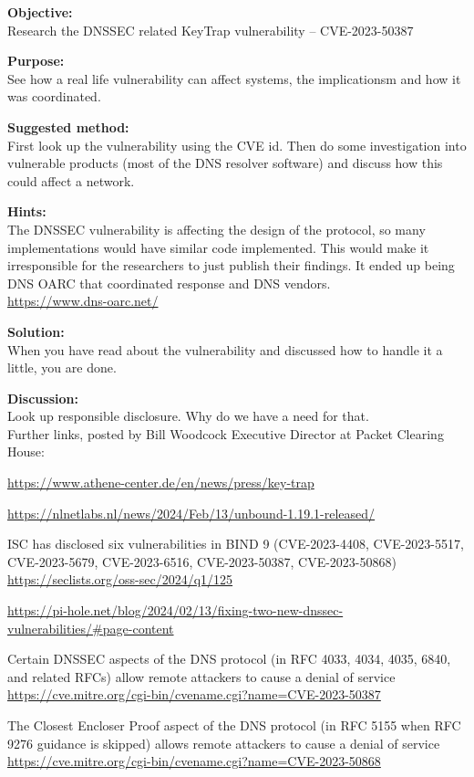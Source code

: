 \documentclass[a4paper,11pt,notitlepage]{report}
\begin{document}
{\bf Objective:}\\
Research the DNSSEC related KeyTrap vulnerability -- CVE-2023-50387

{\bf Purpose:}\\
See how a real life vulnerability can affect systems, the implicationsm and how it was coordinated.

{\bf Suggested method:}\\
First look up the vulnerability using the CVE id. Then do some investigation into vulnerable products (most of the DNS resolver software) and discuss how this could affect a network.

{\bf Hints:}\\
The DNSSEC vulnerability is affecting the design of the protocol, so many implementations would have similar code implemented. This would make it irresponsible for the researchers to just publish their findings.
It ended up being DNS OARC that coordinated response and DNS vendors.\\
\url{https://www.dns-oarc.net/}

{\bf Solution:}\\
When you have read about the vulnerability and discussed how to handle it a little, you are done.

{\bf Discussion:}\\
Look up responsible disclosure. Why do we have a need for that.\\
Further links, posted by Bill Woodcock Executive Director at Packet Clearing House:
\begin{list2}
\item \url{https://www.athene-center.de/en/news/press/key-trap}
\item \url{https://nlnetlabs.nl/news/2024/Feb/13/unbound-1.19.1-released/}
\item ISC has disclosed six vulnerabilities in BIND 9 (CVE-2023-4408, CVE-2023-5517, CVE-2023-5679, CVE-2023-6516, CVE-2023-50387, CVE-2023-50868)\\
\url{https://seclists.org/oss-sec/2024/q1/125}
\item \url{https://pi-hole.net/blog/2024/02/13/fixing-two-new-dnssec-vulnerabilities/#page-content}
\item Certain DNSSEC aspects of the DNS protocol (in RFC 4033, 4034, 4035, 6840, and related RFCs) allow remote attackers to cause a denial of service\\
\url{https://cve.mitre.org/cgi-bin/cvename.cgi?name=CVE-2023-50387}
\item The Closest Encloser Proof aspect of the DNS protocol (in RFC 5155 when RFC 9276 guidance is skipped) allows remote attackers to cause a denial of service\\
\url{https://cve.mitre.org/cgi-bin/cvename.cgi?name=CVE-2023-50868}
\end{list2}
\end{document}
